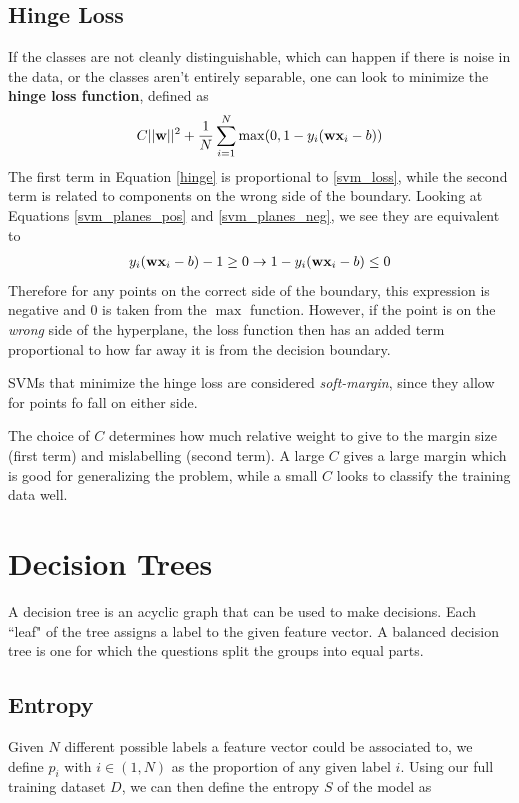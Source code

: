 \subsection{Hinge Loss}

If the classes are not cleanly distinguishable, which can happen if there is noise in the data, or the classes aren't entirely separable, one can look to minimize the \textbf{hinge loss function}, defined as
\begin{align}\label{hinge}
	C||\textbf{w}||^2 + \frac{1}{N}\sum_{i=1}^N \max(0,1-y_i(\textbf{wx}_i-b))
\end{align}
The first term in Equation \ref{hinge} is proportional to \ref{svm_loss}, while the second term is related to components on the wrong side of the boundary. Looking at Equations \ref{svm_planes_pos} and \ref{svm_planes_neg}, we see they are equivalent to 
\begin{align}
	y_i(\textbf{wx}_i-b) -1\ge 0\rightarrow 1- y_i(\textbf{wx}_i-b) \le 0
\end{align}
Therefore for any points on the correct side of the boundary, this expression is negative and $0$ is taken from the $\max$ function. However, if the point is on the \emph{wrong} side of the hyperplane, the loss function then has an added term proportional to how far away it is from the decision boundary.

SVMs that minimize the hinge loss are considered \emph{soft-margin}, since they allow for points fo fall on either side.

The choice of $C$ determines how much relative weight to give to the margin size (first term) and mislabelling (second term). A large $C$ gives a large margin which is good for generalizing the problem, while a small $C$  looks to classify the training data well.

\section{Decision Trees}
A decision tree is an acyclic graph that can be used to make decisions. Each ``leaf" of the tree assigns a label to the given feature vector. A balanced decision tree is one for which the questions split the groups into equal parts.

\subsection{Entropy}
Given $N$ different possible labels a feature vector could be associated to, we define $p_i$ with $i\in (1,N)$ as the proportion of any given label $i$. Using our full training dataset $D$, we can then define the entropy $S$ of the model as 

